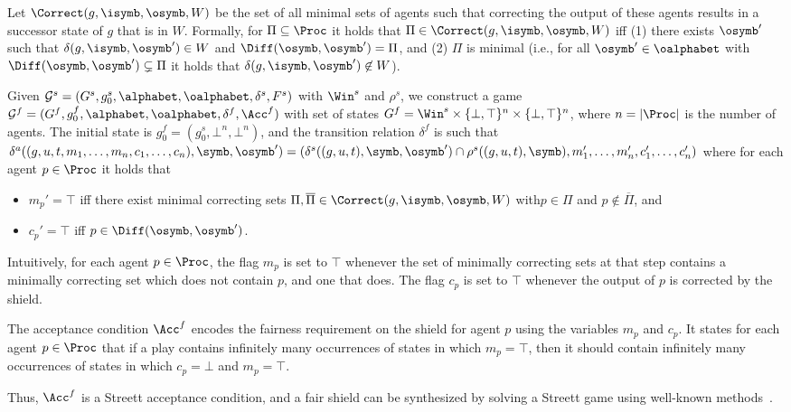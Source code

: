 Let $\Correct(g,\isymb,\osymb,W)$ be the set of all minimal sets of agents such that correcting the output of these agents results in a successor state of $g$ that is in $W$.
Formally, for $\Pi \subseteq \Proc$ it holds that $\Pi \in \Correct(g,\isymb,\osymb,W)$ iff (1) there exists $\osymb'$ such that $\delta(g,\isymb,\osymb') \in W$ and $\Diff(\osymb,\osymb') = \Pi$, and (2) $\Pi$ is minimal
(i.e., for all $\osymb' \in\oalphabet$ with $\Diff(\osymb,\osymb') \subsetneq \Pi$ it holds that $\delta(g,\isymb,\osymb') \not\in W$).

Given  $\mathcal G^s = (G^s, g_0^s,\alphabet,\oalphabet,\delta^s,F^s)$ with $\Win^s$ and $\rho^s$,
we construct a game $\mathcal G^{f} = (G^f, g_0^f,\alphabet,\oalphabet,\delta^{f}, \Acc^{f})$ with
set of states $G^f = \Win^s \times \{\bot,\top\}^n\times \{\bot,\top\}^n$, where $n = |\Proc|$ is the number of agents.
The initial state is $g_0^f = (g_0^s,\bot^n,\bot^n)$, and
the transition relation $\delta^{f}$ is such that
%
$\delta^{a}((g,u,t,m_1,\ldots,m_n,c_1,\ldots,c_n),\symb,\osymb')=(\delta^s((g,u,t), \symb,\osymb')\cap\rho^s((g,u,t), \symb),m_1',\ldots,m_n',c_1',\ldots,c_n')$ where for each agent $p \in \Proc$ it holds that
\begin{itemize}
\item $m_p'= \top$ iff there exist minimal correcting sets $\Pi,\overline \Pi\in \Correct(g,\isymb,\osymb,W)$ with$p \in \Pi$ and $p \not \in \overline \Pi$, and
\item $c_p' = \top$ iff $p\in \Diff(\osymb, \osymb')$.
\end{itemize}
Intuitively, for each agent $p \in \Proc$, the  flag $m_p$ is set to $\top$ whenever the set of  minimally correcting sets at that step contains a  minimally correcting set which does not contain $p$, and one that does. The flag $c_p$ is set to $\top$ whenever the output of $p$ is corrected by the shield.

The acceptance condition $\Acc^{f}$ encodes the fairness requirement on the shield for agent $p$ using the variables $m_p$ and $c_p$. It states  for each agent $p\in \Proc$ that if a play contains infinitely many occurrences of states in which $m_p = \top$, then it should contain infinitely many occurrences of states in which  $c_p  = \bot$ and $m_p=\top$. 

Thus, $\Acc^{f}$ is a Streett acceptance condition, and a fair shield can be synthesized by solving a 
Streett game using well-known methods~\cite{PitermanP06}.

